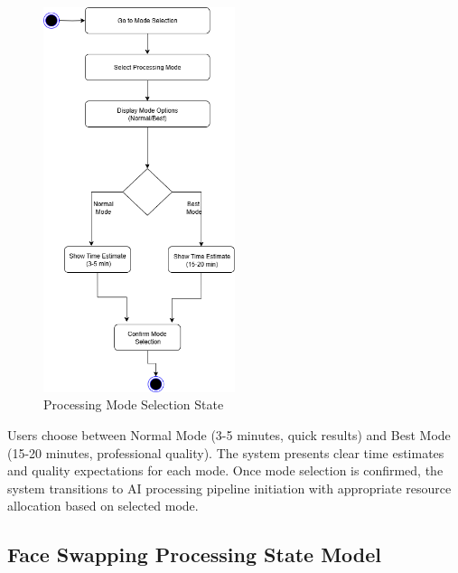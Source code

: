 \documentclass[12pt,a4paper]{report}
\begin{document}
\begin{figure}[H]
\centering
\includegraphics[width=0.5\textwidth]{figures/processing_mode_state.png}
\caption{Processing Mode Selection State}
\label{fig:processing_mode_state}
\end{figure}

Users choose between Normal Mode (3-5 minutes, quick results) and Best Mode (15-20 minutes, professional quality). The system presents clear time estimates and quality expectations for each mode. Once mode selection is confirmed, the system transitions to AI processing pipeline initiation with appropriate resource allocation based on selected mode.

\subsection{Face Swapping Processing State Model}
\end{document}
